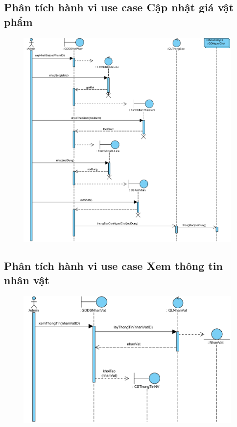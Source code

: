 \documentclass[3p]{elsarticle}
\begin{document}
\subsection{Phân tích hành vi use case Cập nhật giá vật phẩm}
\begin{figure}[!htbp]
	\hspace*{-.5in}
	\centering
	\includegraphics[scale=.55]{images/sequence-pdfs/admin/updateItemPrice.pdf}
\end{figure}
\newpage

\subsection{Phân tích hành vi use case Xem thông tin nhân vật}
\begin{figure}[!htbp]
	\hspace*{-.5in}
	\centering
	\includegraphics[scale=.55]{images/sequence-pdfs/admin/viewCharacterInfo.pdf}
\end{figure}
\newpage
\end{document}
